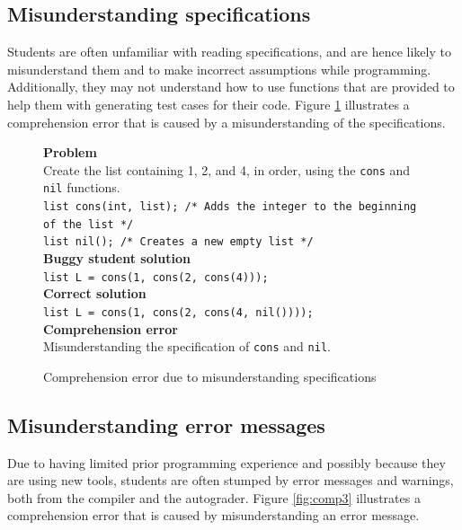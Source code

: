 \documentclass{sig-alternate}
\begin{document}
\subsection{Misunderstanding specifications}
\label{sec:comp2}
Students are often unfamiliar with reading specifications, and are hence likely to misunderstand them and to make incorrect assumptions while programming. Additionally, they may not understand how to use functions that are provided to help them with generating test cases for their code. Figure \ref{fig:comp2} illustrates a comprehension error that is caused by a misunderstanding of the specifications.\\

\begin{figure}
\begin{framed}
\setlength{\parindent}{0cm}
\textbf{Problem}\\
Create the list containing 1, 2, and 4, in order, using the \texttt{cons} and \texttt{nil} functions.\\

\texttt{list cons(int, list); /* Adds the integer to the beginning of the list */\\ list nil(); /* Creates a new empty list */}\\

\textbf{Buggy student solution}\\
\texttt{list L = cons(1, cons(2, cons(4)));}\\

\textbf{Correct solution}\\
\texttt{list L = cons(1, cons(2, cons(4, nil())));}\\

\textbf{Comprehension error}\\
Misunderstanding the specification of \texttt{cons} and \texttt{nil}.
\end{framed}
\caption{Comprehension error due to misunderstanding specifications}
\label{fig:comp2}
\end{figure}

\subsection{Misunderstanding error messages}
Due to having limited prior programming experience and possibly because they are using new tools, students are often stumped by error messages and warnings, both from the compiler and the autograder. Figure \ref{fig:comp3} illustrates a comprehension error that is caused by misunderstanding an error message.
\end{document}
